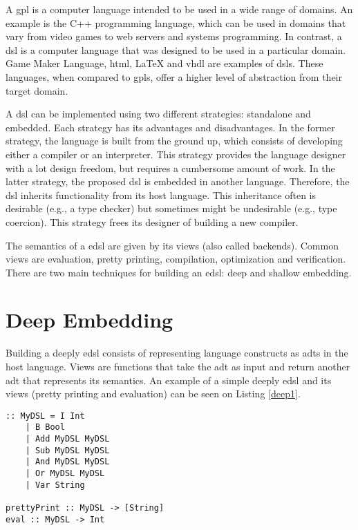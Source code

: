 A \ac{gpl} is a computer language intended to be used in a wide range of domains. An example is the C++ programming language, which can be used in domains that vary from video games to web servers and systems programming. In contrast, a \acf{dsl} is a computer language that was designed to be used in a particular domain. Game Maker Language, \acs{html}, LaTeX and \acs{vhdl} are examples of \acp{dsl}. These languages, when compared to \acp{gpl}, offer a higher level of abstraction from their target domain.

A \ac{dsl} can be implemented using two different strategies: standalone and embedded. Each strategy has its advantages and disadvantages. In the former strategy, the language is built from the ground up, which consists of developing either a compiler or an interpreter. This strategy provides the language designer with a lot design freedom, but requires a cumbersome amount of work. In the latter strategy, the proposed \ac{dsl} is embedded in another language. Therefore, the \ac{dsl} inherits functionality from its host language. This inheritance often is desirable (e.g., a type checker) but sometimes might be undesirable (e.g., type coercion). This strategy frees its designer of building a new compiler.

The semantics of a \acf{edsl} are given by its views (also called backends). Common views are evaluation, pretty printing, compilation, optimization and verification. There are two main techniques for building an \ac{edsl}: deep and shallow embedding.

\section{Deep Embedding}

Building a deeply \ac{edsl} consists of representing language constructs as \acp{adt} in the host language. Views are functions that take the \ac{adt} as input and return another \ac{adt} that represents its semantics. An example of a simple deeply \ac{edsl} and its views (pretty printing and evaluation) can be seen on Listing \ref{deep1}.


\begin{lstlisting}[caption=A simple deeply \ac{edsl} and its views,captionpos=b,label=deep1]
:: MyDSL = I Int
    | B Bool
    | Add MyDSL MyDSL
    | Sub MyDSL MyDSL
    | And MyDSL MyDSL
    | Or MyDSL MyDSL
    | Var String
    
prettyPrint :: MyDSL -> [String]
eval :: MyDSL -> Int
\end{lstlisting}

